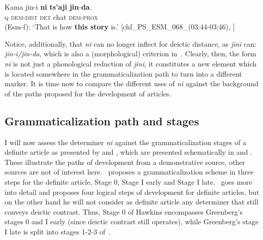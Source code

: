 \documentclass[output=paper
,modfonts
,nonflat]{langsci/langscibook}
\begin{document}
\gll Kama jin-i \textbf{ni} \textbf{ts'aji} \textbf{jin}-\textbf{da}.\\
\textsc{q} \textsc{dem}-\textsc{dist} \textsc{det} {chat} \textsc{dem}-\textsc{prox} \\
\glt (Esm-f): `That is how \textbf{this story} is.' [chf\_PS\_ESM\_068\_(03:44-03:46), \citealt{Delgado-Galvan2018archive}]
\z

Notice, additionally, that \textit{ni} can no longer inflect for deictic distance, as \textit{jini} can: \textit{jin-i/jin-da}, which is also a (morphological) criterion in~\citet[][118]{Diessel1999}. Clearly, then, the form \textit{ni} is not just a phonological reduction of \textit{jini}, it constitutes a new element which is located somewhere in the grammaticalization path to turn into a different marker. It is time now to compare the different uses of \textit{ni} against the background of the paths proposed for the development of articles.

\subsection{Grammaticalization path and stages}\label{sec:pico:4.2}

I will now assess the determiner \textit{ni} against the grammaticalization stages of a definite article as presented by \citet[61--74]{Greenberg1978howgender} and \citet[84--86]{Hawkins2004}, which are presented schematically in  and . These illustrate the paths of development from a demonstrative source, other sources are not of interest here.~\cite{Greenberg1978howgender} proposes a grammaticalization scheme in three steps for the definite article, Stage 0, Stage I early and Stage I late.~\cite{Hawkins2004} goes more into detail and proposes four logical steps of development for definite articles, but on the other hand he will not consider as definite article any determiner that still conveys deictic contrast. Thus, Stage 0 of Hawkins encompasses Greenberg's stages 0 and I early (since deictic contrast still operates), while Greenberg's stage I late is split into stages 1-2-3 of~\cite{Hawkins2004}.
\end{document}
